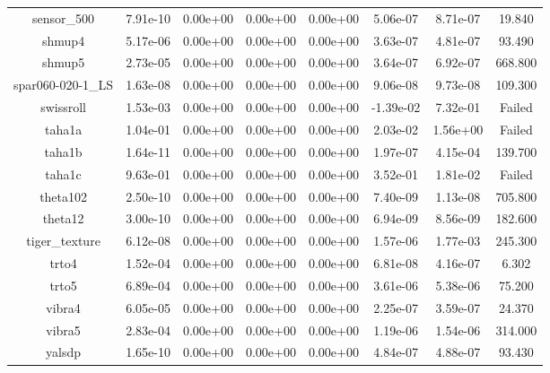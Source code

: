 {{\begin{table}[h]
\begin{center}
{\begin{tabular}{cccccccc}
          sensor\_500 & 7.91e-10 & 0.00e+00 & 0.00e+00 & 0.00e+00 & 5.06e-07 & 8.71e-07 & 19.840 \\ 
              shmup4 & 5.17e-06 & 0.00e+00 & 0.00e+00 & 0.00e+00 & 3.63e-07 & 4.81e-07 & 93.490 \\ 
              shmup5 & 2.73e-05 & 0.00e+00 & 0.00e+00 & 0.00e+00 & 3.64e-07 & 6.92e-07 & 668.800 \\ 
    spar060-020-1\_LS & 1.63e-08 & 0.00e+00 & 0.00e+00 & 0.00e+00 & 9.06e-08 & 9.73e-08 & 109.300 \\ 
           swissroll & 1.53e-03 & 0.00e+00 & 0.00e+00 & 0.00e+00 & -1.39e-02 & 7.32e-01 & Failed \\ 
              taha1a & 1.04e-01 & 0.00e+00 & 0.00e+00 & 0.00e+00 & 2.03e-02 & 1.56e+00 & Failed \\ 
              taha1b & 1.64e-11 & 0.00e+00 & 0.00e+00 & 0.00e+00 & 1.97e-07 & 4.15e-04 & 139.700 \\ 
              taha1c & 9.63e-01 & 0.00e+00 & 0.00e+00 & 0.00e+00 & 3.52e-01 & 1.81e-02 & Failed \\ 
            theta102 & 2.50e-10 & 0.00e+00 & 0.00e+00 & 0.00e+00 & 7.40e-09 & 1.13e-08 & 705.800 \\ 
             theta12 & 3.00e-10 & 0.00e+00 & 0.00e+00 & 0.00e+00 & 6.94e-09 & 8.56e-09 & 182.600 \\ 
       tiger\_texture & 6.12e-08 & 0.00e+00 & 0.00e+00 & 0.00e+00 & 1.57e-06 & 1.77e-03 & 245.300 \\ 
               trto4 & 1.52e-04 & 0.00e+00 & 0.00e+00 & 0.00e+00 & 6.81e-08 & 4.16e-07 & 6.302 \\ 
               trto5 & 6.89e-04 & 0.00e+00 & 0.00e+00 & 0.00e+00 & 3.61e-06 & 5.38e-06 & 75.200 \\ 
              vibra4 & 6.05e-05 & 0.00e+00 & 0.00e+00 & 0.00e+00 & 2.25e-07 & 3.59e-07 & 24.370 \\ 
              vibra5 & 2.83e-04 & 0.00e+00 & 0.00e+00 & 0.00e+00 & 1.19e-06 & 1.54e-06 & 314.000 \\ 
              yalsdp & 1.65e-10 & 0.00e+00 & 0.00e+00 & 0.00e+00 & 4.84e-07 & 4.88e-07 & 93.430 \\  
      \bottomrule
    \end{tabular}
  }  
\end{center}  
\end{table}}}


